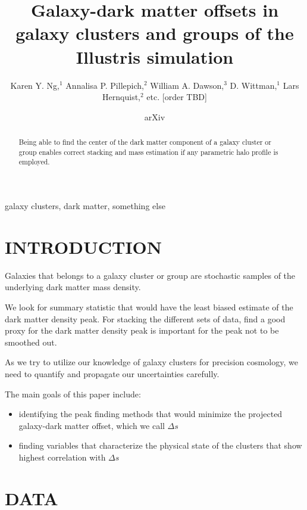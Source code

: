 \documentclass[letterpaper,useAMS,usenatbib]{mn2e}
\title[
	Galaxy-dark matter offsets in galaxy clusters and groups of the
Illustris simulation
]
{Galaxy-dark matter offsets in galaxy clusters and groups of the
Illustris simulation}
\author[Karen Y. Ng et al.]{Karen Y. Ng,$^{1}$
	Annalisa P. Pillepich,$^{2}$ 
	William A. Dawson,$^{3}$ 
	D. Wittman,$^{1}$
	\newauthor Lars Hernquist,$^{2}$
	etc. [order TBD]
}
\begin{document}
\date{arXiv} \pagerange{\pageref{firstpage}--\pageref{lastpage}}
 \maketitle\label{firstpage}
\begin{abstract} 
	Being able to find the center of the dark matter component of a galaxy cluster or
	group enables correct stacking and mass estimation if any parametric halo
	profile is employed. 
\end{abstract}
\begin{keywords}
	galaxy clusters, dark matter, something else 
\end{keywords}
\section{INTRODUCTION} 

Galaxies that belongs to a galaxy cluster or group are stochastic samples
of the underlying dark matter mass density. 

We look for summary statistic that would have the least biased estimate of
the dark matter density peak. For stacking the different sets of data, 
find a good proxy for the dark matter density peak is important for the
peak not to be smoothed out. 

As we try to utilize our knowledge of galaxy clusters for precision cosmology,
we need to quantify and propagate our uncertainties carefully.

The main goals of this paper include:
\begin{itemize}
		\item identifying the peak finding methods that would minimize the
			projected galaxy-dark matter offset, which we call $\Delta s$ 
		\item finding variables that characterize the physical state of the
			clusters that show highest correlation with $\Delta s$ 
\end{itemize}

\section{DATA}
\end{document}
